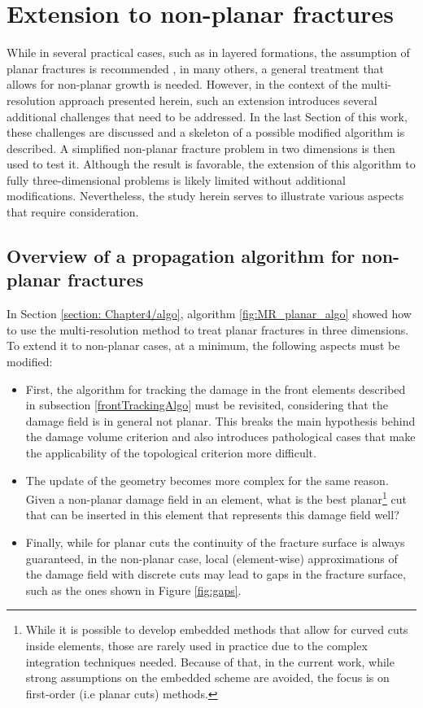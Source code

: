 \section{Extension to non-planar fractures}
\label{section: Chapter4/nonplanar}

While in several practical cases, such as in layered formations, the assumption of planar fractures is recommended \cite{mcclure2020planar}, in many others, a general treatment that allows for non-planar growth is needed. However, in the context of the multi-resolution approach presented herein, such an extension introduces several additional challenges that need to be addressed. In the last Section of this work, these challenges are discussed and a skeleton of a possible modified algorithm is described. A simplified non-planar fracture problem in two dimensions is then used to test it. Although the result is favorable, the extension of this algorithm to fully three-dimensional problems is likely limited without additional modifications. Nevertheless, the study herein serves to illustrate various aspects that require consideration.  

\subsection{Overview of a propagation algorithm for non-planar fractures}\label{basicNonplanarAlgo}

In Section \ref{section: Chapter4/algo}, algorithm \ref{fig:MR_planar_algo} showed how to use the multi-resolution method to treat planar fractures in three dimensions. To extend it to non-planar cases, at a minimum, the following aspects must be modified: 

\begin{itemize}
    \item First, the algorithm for tracking the damage in the front elements described in subsection \ref{frontTrackingAlgo} must be revisited, considering that the damage field is in general not planar. This breaks the main hypothesis behind the damage volume criterion and also introduces pathological cases that make the applicability of the topological criterion more difficult.
    
    \item The update of the geometry becomes more complex for the same reason. Given a non-planar damage field in an element, what is the best planar\footnote{While it is possible to develop embedded methods that allow for curved cuts inside elements, those are rarely used in practice due to the complex integration techniques needed. Because of that, in the current work, while strong assumptions on the embedded scheme are avoided, the focus is on first-order (i.e planar cuts) methods.} cut that can be inserted in this element that represents this damage field well?
    
    \item Finally, while for planar cuts the continuity of the fracture surface is always guaranteed, in the non-planar case, local (element-wise) approximations of the damage field with discrete cuts may lead to gaps in the fracture surface, such as the ones shown in Figure \ref{fig:gaps}.
\end{itemize}

